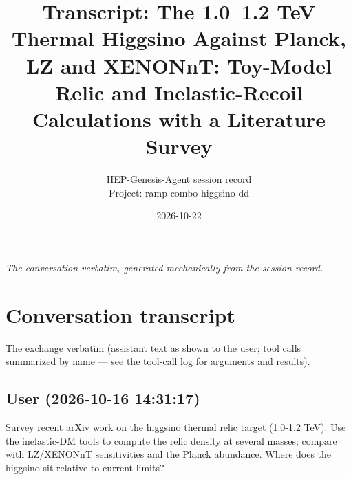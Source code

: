 \documentclass[11pt,a4paper]{article}
\title{Transcript: The 1.0--1.2 TeV Thermal Higgsino Against Planck, LZ and XENONnT: Toy-Model Relic and Inelastic-Recoil Calculations with a Literature Survey}
\author{HEP-Genesis-Agent session record \\ \small Project: ramp-combo-higgsino-dd}
\date{2026-10-22}
\begin{document}
\maketitle
\noindent\textit{\small The conversation verbatim, generated mechanically from the session record.}
\vspace{1em}



\appendix
\section{Conversation transcript}
\label{app:transcript}
The exchange verbatim (assistant text as shown to the user; tool calls summarized by name --- see the tool-call log for arguments and results).
\subsection*{User \small(2026-10-16 14:31:17)}
Survey recent arXiv work on the higgsino thermal relic target (1.0-1.2 TeV). Use the inelastic-DM tools to compute the relic density at several masses; compare with LZ/XENONnT sensitivities and the Planck abundance. Where does the higgsino sit relative to current limits?
\end{document}
